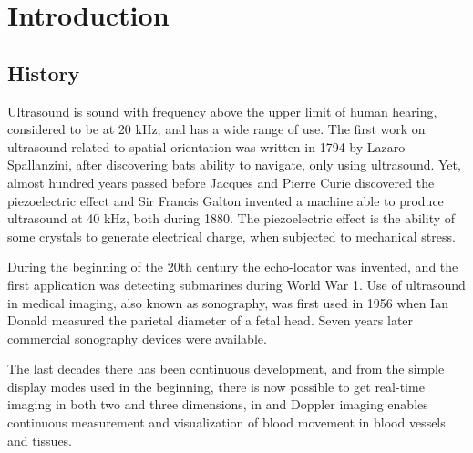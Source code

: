 \section{Introduction}

\subsection{History}
Ultrasound is sound with frequency above the upper limit of human hearing, considered to be at 20 kHz, and has a wide range of use. The first work on ultrasound related to spatial orientation was written in 1794 by Lazaro Spallanzini, after discovering bats ability to navigate, only using ultrasound. Yet, almost hundred years passed before Jacques and Pierre Curie discovered the piezoelectric effect and Sir Francis Galton invented a machine able to produce ultrasound at 40 kHz, both during 1880. The piezoelectric effect is the ability of some crystals to generate electrical charge, when subjected to mechanical stress.

During the beginning of the 20th century the echo-locator was invented, and the first application was detecting submarines during World War 1. Use of ultrasound in medical imaging, also known as sonography, was first used in 1956 when Ian Donald measured the parietal diameter of a fetal head. Seven years later commercial sonography devices were available.

The last decades there has been continuous development, and from the simple display modes used in the beginning, there is now possible to get real-time imaging in both two and three dimensions, in and Doppler imaging enables continuous measurement and visualization of blood movement in blood vessels and tissues.

\subsection{} 
   